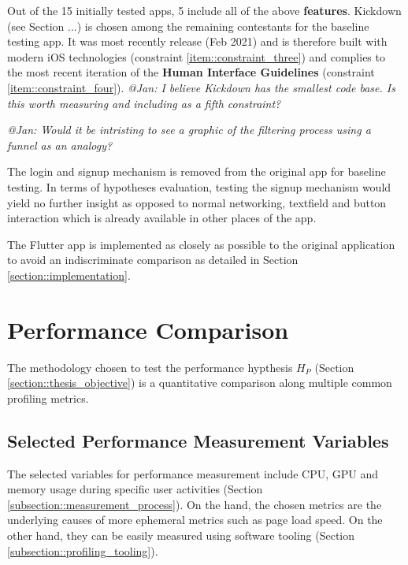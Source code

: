Out of the 15 initially tested apps, 5 include all of the above \textbf{features}. Kickdown (see Section ...) is chosen among the remaining 
contestants for the baseline testing app. It was most recently release (Feb 2021) and is therefore built with modern iOS technologies (constraint \ref{item::constraint_three})
and complies to the most recent iteration of the \textbf{Human Interface Guidelines} (constraint \ref{item::constraint_four}).
\textit{@Jan: I believe Kickdown has the smallest code base. Is this worth measuring and including as a fifth constraint?}

\textit{@Jan: Would it be intristing to see a graphic of the filtering process using a funnel as an analogy?}


The login and signup mechanism is removed from the original app for baseline testing. 
In terms of hypotheses evaluation, testing the signup mechanism would yield no further insight as opposed to normal networking, 
textfield and button interaction which is already available in other places of the app.

The Flutter app is implemented as closely as possible to the original application to avoid an indiscriminate comparison as detailed in Section \ref{section::implementation}.

\section{Performance Comparison} \label{section::performance_comparison_design}
The methodology chosen to test the performance hypthesis $H_P$ (Section \ref{section::thesis_objective}) is a quantitative comparison along multiple common profiling metrics.

\subsection{Selected Performance Measurement Variables}
The selected variables for performance measurement include CPU, GPU and memory usage during specific user activities (Section \ref{subsection::measurement_process}).
On the hand, the chosen metrics are the underlying causes of more ephemeral metrics such as page load speed. On the other hand, they can be easily 
measured using software tooling (Section \ref{subsection::profiling_tooling}).

